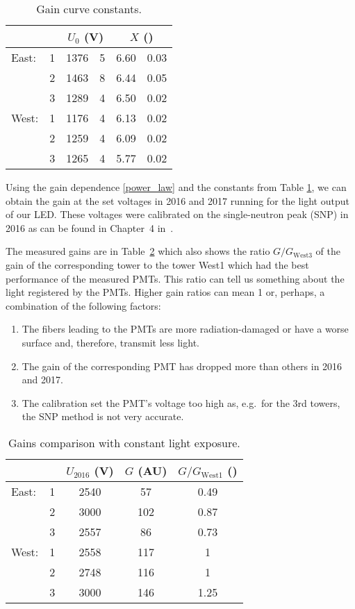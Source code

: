 \documentclass[a4paper,10pt]{article}
\begin{document}
\begin{table}[htb]
\caption{\label{gainTable}Gain curve constants.}
\begin{center}
\begin{tabular}{lcr@{ $\pm$ }lr@{ $\pm$ }l}
\toprule
&&\multicolumn{2}{c}{$U_0$ (V)}&\multicolumn{2}{c}{$X$ ()}\\
\midrule
East:&1&1376&5&6.60&0.03\\
     &2&1463&8&6.44&0.05\\
     &3&1289&4&6.50&0.02\\
\midrule
West:&1&1176&4&6.13&0.02\\
     &2&1259&4&6.09&0.02\\
     &3&1265&4&5.77&0.02\\
\bottomrule
\end{tabular}
\end{center}
\end{table}

Using the gain dependence \eqref{power_law} and the constants from Table \ref{gainTable}, we can obtain the gain at the set voltages in 2016 and 2017 running for the light output of our LED\@. These voltages were calibrated on the single-neutron peak (SNP) in 2016 as can be found in Chapter~4 in~\cite{ZDC_ops_manual}\@. 

The measured gains are in Table~\ref{glassTable} which also shows the ratio $G/G_\text{West3}$ of the gain of the corresponding tower to the tower West1 which had the best performance of the measured PMTs\@. This ratio can tell us something about the light registered by the PMTs. Higher gain ratios can mean 1 or, perhaps, a combination of the following factors:
\begin{enumerate}
\item The fibers leading to the PMTs are more radiation-damaged or have a worse surface and, therefore, transmit less light.
\item The gain of the corresponding PMT has dropped more than others in 2016 and 2017.
\item The calibration set the PMT's voltage too high as, e.g.\ for the 3rd towers, the SNP method is not very accurate. 
\end{enumerate}


\begin{table}[htb]
\caption{\label{glassTable}Gains comparison with constant light exposure.}
\begin{center}
\begin{tabular}{lcccc}
\toprule
&&$U_\text{2016}$ (V)&$G$ (AU)& $G/G_\text{West1}$ ()\\
\midrule
East:&1&2540&57&0.49\\
&2&3000&102&0.87\\
&3&2557&86&0.73\\
\midrule
West:&1&2558&117&1\\
&2&2748&116&1\\
&3&3000&146&1.25\\
\bottomrule
\end{tabular}
\end{center}
\end{table}
\end{document}
